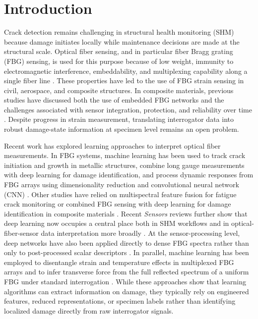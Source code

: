 \documentclass[notspecified,article,submit,pdftex,moreauthors]{Definitions/mdpi}
\begin{document}
\section{Introduction}

Crack detection remains challenging in structural health monitoring (SHM) because damage initiates locally while maintenance decisions are made at the structural scale. Optical fiber sensing, and in particular fiber Bragg grating (FBG) sensing, is used for this purpose because of low weight, immunity to electromagnetic interference, embeddability, and multiplexing capability along a single fiber line \cite{ye2014,yassin2024,golovastikov2025}. These properties have led to the use of FBG strain sensing in civil, aerospace, and composite structures. In composite materials, previous studies have discussed both the use of embedded FBG networks and the challenges associated with sensor integration, protection, and reliability over time \cite{kinet2014,gabardi2023}. Despite progress in strain measurement, translating interrogator data into robust damage-state information at specimen level remains an open problem.

Recent work has explored learning approaches to interpret optical fiber measurements. In FBG systems, machine learning has been used to track crack initiation and growth in metallic structures, combine long gauge measurements with deep learning for damage identification, and process dynamic responses from FBG arrays using dimensionality reduction and convolutional neural network (CNN) \cite{chilelli2019,zhang2020,wang2023}. Other studies have relied on multispectral feature fusion for fatigue crack monitoring or combined FBG sensing with deep learning for damage identification in composite materials \cite{zhao2025,xiong2025}. Recent \textit{Sensors} reviews further show that deep learning now occupies a central place both in SHM workflows and in optical-fiber-sensor data interpretation more broadly \cite{jia2023,cao2025}. At the sensor-processing level, deep networks have also been applied directly to dense FBG spectra rather than only to post-processed scalar descriptors \cite{kokhanovskiy2021}. In parallel, machine learning has been employed to disentangle strain and temperature effects in multiplexed FBG arrays \cite{saha2025} and to infer transverse force from the full reflected spectrum of a uniform FBG under standard interrogation \cite{tocanne2025}. While these approaches show that learning algorithms can extract information on damage, they typically rely on engineered features, reduced representations, or specimen labels rather than identifying localized damage directly from raw interrogator signals.
\end{document}
